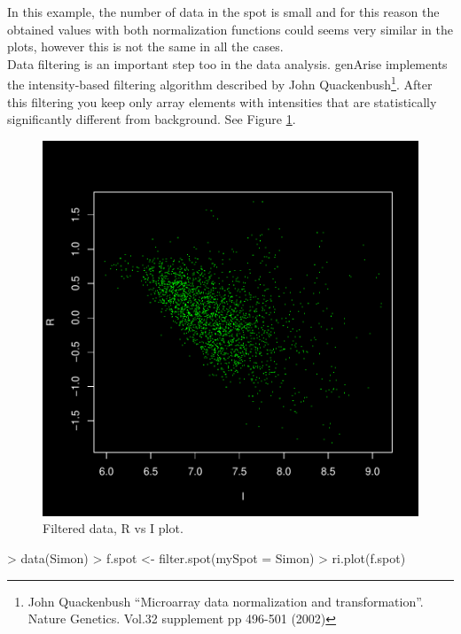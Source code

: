 \documentclass[12pt]{article}
\begin{document}
In this example, the number of data in the spot is small and for this reason the obtained values with both normalization functions could seems very similar in the plots, however this is not the same in all the cases.\\

Data filtering is an important step too in the data analysis. genArise implements the intensity-based filtering algorithm described by John Quackenbush\footnote[2]{ John Quackenbush \textquotedblleft Microarray data normalization and transformation\textquotedblright. Nature Genetics. Vol.32 supplement pp 496-501 (2002)}. After this filtering you keep only array elements with intensities that are statistically significantly different from background. See Figure \ref{fig10}.\\

\begin{figure}[h]
\begin{center}
\includegraphics{example-genArise-012}
\caption{Filtered data, R vs I plot. \label{fig10}}	
\end{center}
\end{figure}

\begin{Scode}
> data(Simon)
> f.spot <- filter.spot(mySpot = Simon)
> ri.plot(f.spot)
\end{Scode}
\end{document}
